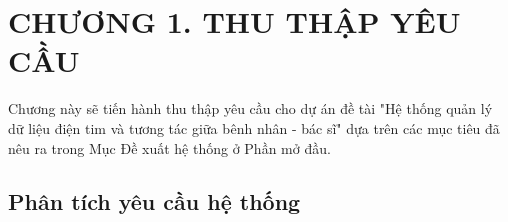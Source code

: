 
\section*{CHƯƠNG 1. THU THẬP YÊU CẦU}
\setcounter{section}{1}
\setcounter{subsection}{0} %
\setcounter{table}{0} %
\setcounter{figure}{0} %
Chương này sẽ tiến hành thu thập yêu cầu cho dự án đề tài "Hệ thống quản lý dữ liệu điện tim và tương tác giữa bênh nhân - bác sĩ"
dựa trên các mục tiêu đã nêu ra trong Mục Đề xuất hệ thống ở Phần mở đầu.

\subsection{Phân tích yêu cầu hệ thống}
